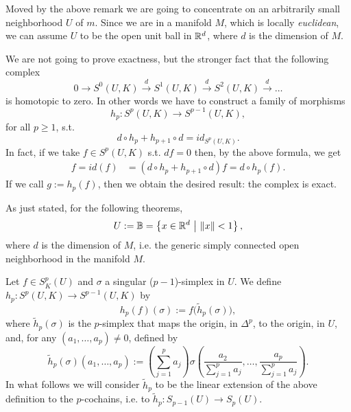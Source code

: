 \begin{rem}
	Moved by the above remark we are going to concentrate on an arbitrarily small neighborhood $U$ of $m$.
	Since we are in a manifold $M$, which is locally \textit{euclidean}, we can assume $U$ to be the open unit ball in $\mathbb{R}^d$, where $d$ is the dimension of $M$.

	We are not going to prove exactness, but the stronger fact that the following complex
	\begin{equation}
		0 \to S^0(U,K) \xrightarrow{d} S^1(U,K) \xrightarrow{d} S^2(U,K) \xrightarrow{d} \dots
	\end{equation} 
	is homotopic to zero.
	In other words we have to construct a family of morphisms
	\begin{equation}
		h_p: S^p(U,K) \to S^{p-1}(U,K)
	,\end{equation} 
	for all $p \geq 1$, s.t.
	\begin{equation}
		d \circ h_p + h_{p+1} \circ d = id_{S^p(U,K)}
	.\end{equation} 
	In fact, if we take $f \in S^p \left(U, K\right)$ s.t. $df = 0$ then, by the above formula, we get
	\begin{align}
		f = id(f) &= (d \circ h_p + h_{p+1} \circ d) f = d \circ h_p (f)
	.\end{align} 
	If we call $g := h_p (f)$, then we obtain the desired result: the complex is exact.
\end{rem}

As just stated, for the following theorems, 
\begin{equation}
	U := \mathbb{B} = \left\{ x \in \R^d \ \middle|\ \norm{x} < 1 \right\}
,\end{equation} 
where $d$ is the dimension of $M$, i.e. the generic simply connected open neighborhood in the manifold $M$.

\begin{defn}[]
	Let $f \in S^p_K(U)$ and $\sigma$ a singular ($p-1$)-simplex in $U$.
	We define $h_p: S^p(U,K) \to S^{p-1}(U,K)$ by
	\begin{equation}
		h_p (f) (\sigma) := f\big(\widetilde{h}_p (\sigma)\big)	
	,\end{equation} 
	where $\widetilde{h}_p(\sigma)$ is the $p$-simplex that maps the origin, in $\Delta^p$, to the origin, in $U$, and, for any $(a_1, \ldots, a_p) \neq 0$, defined by
	\begin{equation}
		\widetilde{h}_p(\sigma) (a_1, \ldots, a_p) := \left( \sum_{j=1}^{p} a_j \right) \sigma \left(\frac{a_2}{\sum_{j=1}^{p} a_j}, \ldots, \frac{a_p}{\sum_{j=1}^{p} a_j} \right)
	.\end{equation}
	In what follows we will consider $\widetilde{h}_p$ to be the linear extension of the above definition to the $p$-cochains, i.e. to $\widetilde{h}_p: S_{p-1}(U) \to S_p(U)$.
\end{defn}

